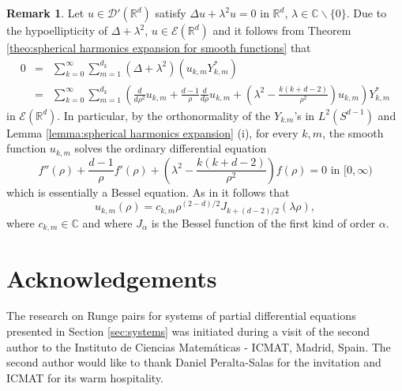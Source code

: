 \documentclass[a4paper,10pt]{amsart}
\newtheorem*{crucial lemma}{Lemma \ref{lem:nice polynomial2}}
\theoremstyle{definition}
\newtheorem{remark}[theorem]{Remark}
\newcommand{\R}{\mathbb{R}}
\newcommand{\C}{\mathbb{C}}
\begin{document}
\begin{remark}\label{rem:ODEs for coefficients in spherical harmonics expansion}
	Let $u\in\mathscr{D}'(\R^d)$ satisfy $\Delta u+\lambda^2 u=0$ in $\R^d$, $\lambda\in\C\backslash\{0\}$. Due to the hypoellipticity of $\Delta +\lambda^2$, $u\in\mathscr{E}(\R^d)$ and it follows from Theorem \ref{theo:spherical harmonics expansion for smooth functions} that
	\begin{eqnarray*}
		0&=&\sum_{k=0}^\infty\sum_{m=1}^{d_k}(\Delta+\lambda^2)\left(u_{k,m}Y^*_{k,m}\right)\\
		&=&\sum_{k=0}^\infty\sum_{m=1}^{d_k} \left( \frac{d}{d\rho^2}u_{k,m}+\frac{d-1}{\rho}\frac{d}{d\rho} u_{k,m}+\left(\lambda^2-\frac{k(k+d-2)}{\rho^2}\right)u_{k,m}\right) Y_{k,m}^*
	\end{eqnarray*}
	in $\mathscr{E}(\R^d)$. In particular, by the orthonormality of the $Y_{k.m}$'s in $L^2(S^{d-1})$ and Lemma \ref{lemma:spherical harmonics expansion} (i), for every $k,m$, the smooth function $u_{k,m}$ solves the ordinary differential equation
	\[f''(\rho)+\frac{d-1}{\rho}f'(\rho)+\left(\lambda^2-\frac{k(k+d-2)}{\rho^2}\right) f(\rho)=0\text{ in }[0,\infty)\]
	which is essentially a Bessel equation. As in \cite[p.~106]{Folland1995} it follows that
	\[u_{k,m}(\rho)=c_{k,m}\rho^{(2-d)/2}J_{k+(d-2)/2}(\lambda\rho),\]
	where $c_{k,m}\in\C$ and where $J_\alpha$ is the Bessel function of the first kind of order $\alpha$.
\end{remark}


\section*{Acknowledgements}

The research on Runge pairs for systems of partial differential equations presented in Section \ref{sec:systems} was initiated during a visit of the second author to the Instituto de Ciencias Matem\'aticas - ICMAT, Madrid, Spain. The second author would like to thank Daniel Peralta-Salas for the invitation and ICMAT for its warm hospitality.




\end{document}

